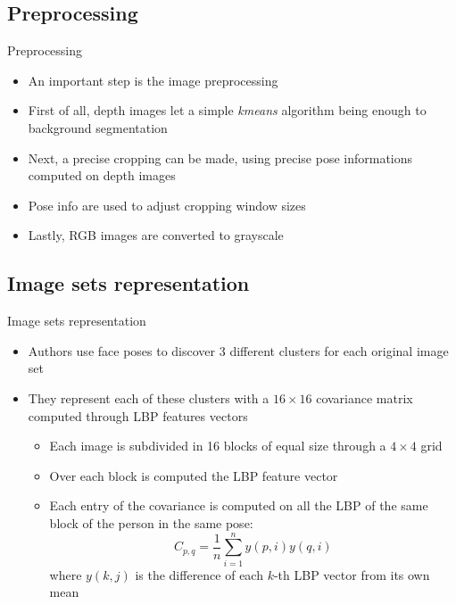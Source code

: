 \documentclass[unknownkeysallowed]{beamer}
\begin{document}
\subsection{Preprocessing}
\begin{frame}{Preprocessing}
	\begin{itemize}
		\item An important step is the image preprocessing
		\item First of all, depth images let a simple \textit{kmeans}
			algorithm being enough to background segmentation
		\item Next, a precise cropping can be made, using precise pose
			informations computed on depth images
		\item Pose info are used to adjust cropping window sizes
		\item Lastly, RGB images are converted to grayscale
	\end{itemize}
\end{frame}

\subsection{Image sets representation}
\begin{frame}{Image sets representation}
	\begin{itemize}
		\item Authors use face poses to discover 3 different clusters
			for each original image set
		\item They represent each of these clusters with a $16 \times
			16$ covariance matrix computed through LBP features
			vectors
			\begin{itemize}
				\item Each image is subdivided in 16 blocks of
					equal size through a $4 \times 4$ grid
				\item Over each block is computed the LBP
					feature vector
				\item Each entry of the covariance is computed
					on all the LBP of the same block of the
					person in the same pose:
					$$
					C_{p, q} = \frac{1}{n} \sum_{i=1}^n
					y(p, i)y(q, i)
					$$
					where $y(k, j)$ is the difference of
					each $k$-th LBP vector from
					its own mean

			\end{itemize}
	\end{itemize}
\end{frame}
\end{document}
